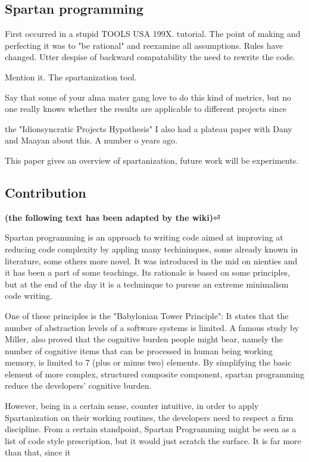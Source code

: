 \subsection{Spartan programming}
First occurred in a stupid TOOLS USA 199X. tutorial.
The point of making and perfecting it was to "be rational" and
reexamine all assumptions.
Rules have changed.
Utter despise of backward compatability the need to rewrite the code.

Mention it. The spartanization tool.

Say that some of your alma mater gang love to do this kind of metrics, but
no one really knows whether the results are applicable to different projects
since \cite{Turnu:Concas:Marchesi:Tonelli:11}

the "Idionsyncratic Projects Hypothesis" I also had a plateau paper with
Dany and Maayan about this. A number o years ago.

This paper gives an overview of spartanization, future work will be
experiments.

\subsection{Contribution}

\textbf{(the following text has been adapted by the wiki)}⏎

Spartan programming is an approach to writing code aimed at improving at
reducing code complexity by appling many techininques, some already known in
literature, some others more novel. It was introduced in the mid on nienties
and it has been a part of some teachings. Its rationale is based on some
principles, but at the end of the day it is a techninque to pursue an extreme
minimalism code writing.

One of these principles is the "Babylonian Tower Principle": It states that the
number of abstraction levels of a software systems is limited. A famous study
by Miller, also proved that the cognitive burden people might bear, namely the
number of cognitive items that can be processed in human being working memory,
is limited to 7 (plus or minus two) elements. By simplifying the basic element
of more complex, structured composite component, spartan programming reduce the
developers' cognitive burden.

However, being in a certain sense, counter intuitive, in order to apply
Spartanization on their working routines, the developers need to respect a firm
discipline. From a certain standpoint, Spartan Programming might be seen as a
list of code style prescription, but it would just scratch the surface. It is
far more than that, since it


